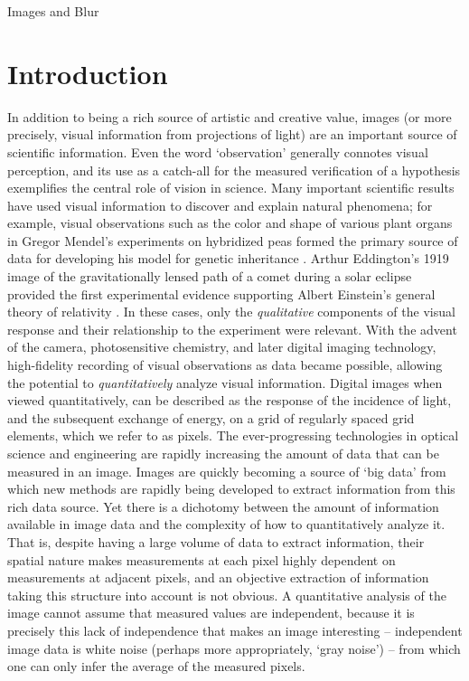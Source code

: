 \setlength{\parindent}{2ex}
\begin{chapter}{Images and Blur}\label{chapter:introduction}
  \section{Introduction}
  In addition to being a rich source of artistic and creative value, images (or more precisely, visual information from projections of light) are an important source of scientific information.
  Even the word `observation' generally connotes visual perception, and its use as a catch-all for the measured verification of a hypothesis exemplifies the central role of vision in science.
  Many important scientific results have used visual information to discover and explain natural phenomena; for example, visual observations such as the color and shape of various plant organs in Gregor Mendel's experiments on hybridized peas formed the primary source of data for developing his model for genetic inheritance \citep{magner2002}.
  Arthur Eddington's 1919 image of the gravitationally lensed path of a comet during a solar eclipse provided the first experimental evidence supporting Albert Einstein's general theory of relativity \citep{eddington1920}.
  In these cases, only the \emph{qualitative} components of the visual response and their relationship to the experiment were relevant.
  With the advent of the camera, photosensitive chemistry, and later digital imaging technology, high-fidelity recording of visual observations as data became possible, allowing the potential to \emph{quantitatively} analyze visual information.
  Digital images when viewed quantitatively, can be described as the response of the incidence of light, and the subsequent exchange of energy, on a grid of regularly spaced grid elements, which we refer to as pixels.
  The ever-progressing technologies in optical science and engineering are rapidly increasing the amount of data that can be measured in an image.
  Images are quickly becoming a source of `big data' from which new methods are rapidly being developed to extract information from this rich data source.
  Yet there is a dichotomy between the amount of information available in image data and the complexity of how to quantitatively analyze it.
That is, despite having a large volume of data to extract information, their spatial nature makes measurements at each pixel highly dependent on measurements at adjacent pixels, and an objective extraction of information taking this structure into account is not obvious.
  A quantitative analysis of the image cannot assume that measured values are independent, because it is precisely this lack of independence that makes an image interesting -- independent image data is white noise (perhaps more appropriately, `gray noise') -- from which one can only infer the average of the measured pixels.


\end{chapter}

